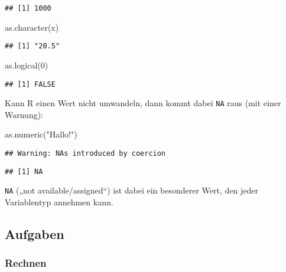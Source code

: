 \documentclass[11pt,german,a4paper]{article}
\newenvironment{Shaded}{\begin{snugshade}}{\end{snugshade}}
\newcommand{\DecValTok}[1]{\textcolor[rgb]{0.00,0.00,0.81}{#1}}
\newcommand{\FunctionTok}[1]{\textcolor[rgb]{0.00,0.00,0.00}{#1}}
\newcommand{\NormalTok}[1]{#1}
\newcommand{\StringTok}[1]{\textcolor[rgb]{0.31,0.60,0.02}{#1}}
\begin{document}
\begin{verbatim}
## [1] 1000
\end{verbatim}

\begin{Shaded}
\begin{Highlighting}[]
\FunctionTok{as.character}\NormalTok{(x)}
\end{Highlighting}
\end{Shaded}

\begin{verbatim}
## [1] "20.5"
\end{verbatim}

\begin{Shaded}
\begin{Highlighting}[]
\FunctionTok{as.logical}\NormalTok{(}\DecValTok{0}\NormalTok{)}
\end{Highlighting}
\end{Shaded}

\begin{verbatim}
## [1] FALSE
\end{verbatim}

Kann R einen Wert nicht umwandeln, dann kommt dabei \texttt{NA} raus (mit einer Warnung):

\begin{Shaded}
\begin{Highlighting}[]
\FunctionTok{as.numeric}\NormalTok{(}\StringTok{"Hallo!"}\NormalTok{)}
\end{Highlighting}
\end{Shaded}

\begin{verbatim}
## Warning: NAs introduced by coercion
\end{verbatim}

\begin{verbatim}
## [1] NA
\end{verbatim}

\texttt{NA} („not available/assigned``) ist dabei ein besonderer Wert, den jeder Variablentyp annehmen kann.

\hypertarget{aufgaben}{%
\subsection{Aufgaben}\label{aufgaben}}

\hypertarget{rechnen}{%
\subsubsection{Rechnen}\label{rechnen}}
\end{document}
